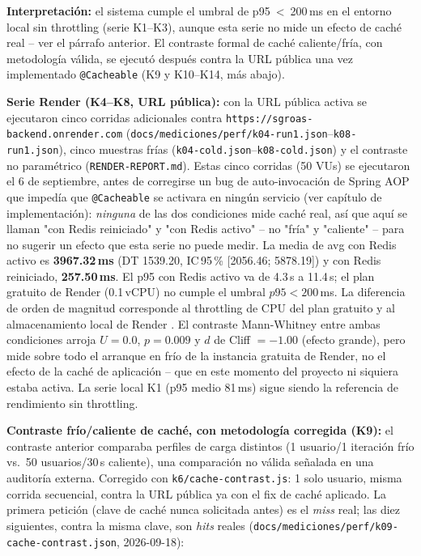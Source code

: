 \textbf{Interpretación:} el sistema cumple el umbral de p95~<~200\,ms en el
entorno local sin throttling (serie K1--K3), aunque esta serie no mide un
efecto de caché real -- ver el párrafo anterior. El contraste formal de
caché caliente/fría, con metodología válida, se ejecutó después contra la
URL pública una vez implementado \texttt{@Cacheable} (K9 y K10--K14, más
abajo).

\textbf{Serie Render (K4--K8, URL pública):} con la URL pública activa se ejecutaron
cinco corridas adicionales contra \texttt{https://sgroas-backend.onrender.com}
(\texttt{docs/mediciones/perf/k04-run1.json}--\texttt{k08-run1.json}), cinco muestras
frías (\texttt{k04-cold.json}--\texttt{k08-cold.json}) y el contraste no paramétrico
(\texttt{RENDER-REPORT.md}). Estas cinco corridas (50 VUs) se ejecutaron el
6 de septiembre, antes de corregirse un bug de auto-invocación de Spring AOP
que impedía que \texttt{@Cacheable} se activara en ningún servicio (ver
capítulo de implementación): \emph{ninguna} de las dos condiciones mide
caché real, así que aquí se llaman "con Redis reiniciado" y "con Redis
activo" -- no "fría" y "caliente" -- para no sugerir un efecto que esta
serie no puede medir. La media de avg con Redis activo es
\textbf{3967.32\,ms} (DT 1539.20, IC\,95\,\% [2056.46; 5878.19]) y con
Redis reiniciado, \textbf{257.50\,ms}. El p95 con Redis activo va de
4.3\,s a 11.4\,s; el plan gratuito de Render (0.1\,vCPU) no cumple el
umbral $p95 < 200$\,ms. La diferencia de orden de magnitud corresponde al
throttling de CPU del plan gratuito y al almacenamiento local de Render
\cite{jiang2015}. El contraste Mann-Whitney entre ambas condiciones arroja
$U = 0.0$, $p = 0.009$ y $d$ de Cliff $= -1.00$ (efecto grande), pero mide
sobre todo el arranque en frío de la instancia gratuita de Render, no el
efecto de la caché de aplicación -- que en este momento del proyecto ni
siquiera estaba activa. La serie local K1 (p95 medio 81\,ms) sigue siendo
la referencia de rendimiento sin throttling.

\textbf{Contraste frío/caliente de caché, con metodología corregida
(K9):} el contraste anterior comparaba perfiles de carga distintos (1
usuario/1 iteración frío vs.\ 50 usuarios/30\,s caliente), una comparación
no válida señalada en una auditoría externa. Corregido con
\texttt{k6/cache-contrast.js}: 1 solo usuario, misma corrida secuencial,
contra la URL pública ya con el fix de caché aplicado. La primera petición
(clave de caché nunca solicitada antes) es el \emph{miss} real; las diez
siguientes, contra la misma clave, son \emph{hits} reales
(\texttt{docs/mediciones/perf/k09-cache-contrast.json}, 2026-09-18):

